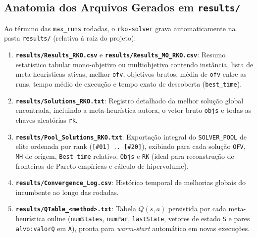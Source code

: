 \documentclass[11pt,a4paper]{article}
\begin{document}
\subsection{Anatomia dos Arquivos Gerados em \texttt{results/}}

Ao término das \texttt{max\_runs} rodadas, o \texttt{rko-solver} grava automaticamente na pasta \texttt{results/} (relativa à raiz do projeto):
\begin{enumerate}[leftmargin=*]
  \item \textbf{\texttt{results/Results\_RKO.csv}} e \textbf{\texttt{results/Results\_MO\_RKO.csv}}: Resumo estatístico tabular mono-objetivo ou multiobjetivo contendo instância, lista de meta-heurísticas ativas, melhor \texttt{ofv}, objetivos brutos, média de \texttt{ofv} entre as runs, tempo médio de execução e tempo exato de descoberta (\texttt{best\_time}).
  \item \textbf{\texttt{results/Solutions\_RKO.txt}}: Registro detalhado da melhor solução global encontrada, incluindo a meta-heurística autora, o vetor bruto \texttt{objs} e todas as chaves aleatórias \texttt{rk}.
  \item \textbf{\texttt{results/Pool\_Solutions\_RKO.txt}}: Exportação integral do \texttt{SOLVER\_POOL} de elite ordenada por rank (\texttt{[\#01] .. [\#20]}), exibindo para cada solução \texttt{OFV}, \texttt{MH} de origem, \texttt{Best time} relativo, \texttt{Objs} e \texttt{RK} (ideal para reconstrução de fronteiras de Pareto empíricas e cálculo de hipervolume).
  \item \textbf{\texttt{results/Convergence\_Log.csv}}: Histórico temporal de melhorias globais do incumbente ao longo das rodadas.
  \item \textbf{\texttt{results/QTable\_<method>.txt}}: Tabela $Q(s,a)$ persistida por cada meta-heurística online (\texttt{numStates}, \texttt{numPar}, \texttt{lastState}, vetores de estado \texttt{S} e pares \texttt{alvo:valorQ} em \texttt{A}), pronta para \emph{warm-start} automático em novas execuções.
\end{enumerate}
\end{document}
